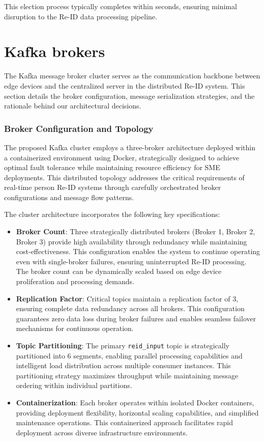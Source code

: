This election process typically completes within seconds, ensuring minimal disruption to the Re-ID data processing pipeline.

\section{Kafka brokers}

The Kafka message broker cluster serves as the communication backbone between edge devices and the centralized server in the distributed Re-ID system. This section details the broker configuration, message serialization strategies, and the rationale behind our architectural decisions.

\subsubsection{Broker Configuration and Topology}

The proposed Kafka cluster employs a three-broker architecture deployed within a containerized environment using Docker, strategically designed to achieve optimal fault tolerance while maintaining resource efficiency for SME deployments. This distributed topology addresses the critical requirements of real-time person Re-ID systems through carefully orchestrated broker configurations and message flow patterns.

The cluster architecture incorporates the following key specifications:

\begin{itemize}
   \item \textbf{Broker Count}: Three strategically distributed brokers (Broker 1, Broker 2, Broker 3) provide high availability through redundancy while maintaining cost-effectiveness. This configuration enables the system to continue operating even with single-broker failures, ensuring uninterrupted Re-ID processing. The broker count can be dynamically scaled based on edge device proliferation and processing demands.
   \item \textbf{Replication Factor}: Critical topics maintain a replication factor of 3, ensuring complete data redundancy across all brokers. This configuration guarantees zero data loss during broker failures and enables seamless failover mechanisms for continuous operation.
   \item \textbf{Topic Partitioning}: The primary \texttt{reid\_input} topic is strategically partitioned into 6 segments, enabling parallel processing capabilities and intelligent load distribution across multiple consumer instances. This partitioning strategy maximizes throughput while maintaining message ordering within individual partitions.
   \item \textbf{Containerization}: Each broker operates within isolated Docker containers, providing deployment flexibility, horizontal scaling capabilities, and simplified maintenance operations. This containerized approach facilitates rapid deployment across diverse infrastructure environments.
\end{itemize}

